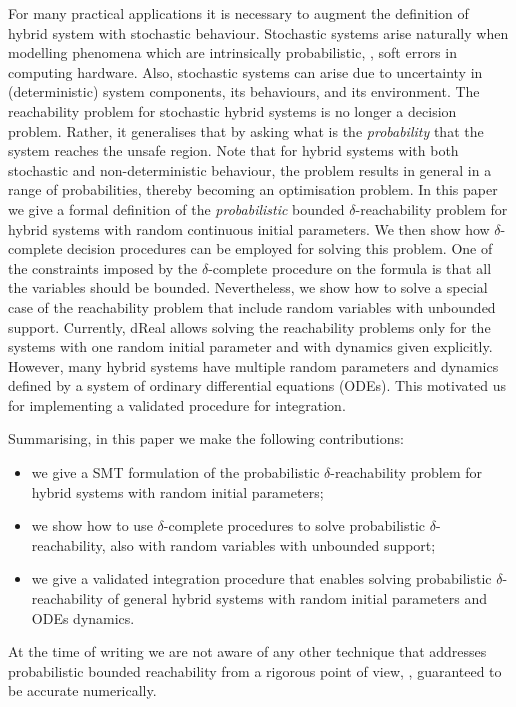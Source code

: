 For many practical applications it is necessary to augment the definition of hybrid system with 
stochastic behaviour. Stochastic systems arise naturally when modelling phenomena which are 
intrinsically probabilistic, \eg, soft errors in computing hardware. Also, stochastic systems 
can arise due to uncertainty in (deterministic) system components, its behaviours, and its 
environment. The reachability problem for stochastic hybrid systems is no longer a decision
problem. Rather, it generalises that by asking what is the {\em probability} that the system
reaches the unsafe region. Note that for hybrid systems with both stochastic and non-deterministic
behaviour, the problem results in general in a range of probabilities, thereby becoming an
optimisation problem. In this paper we give a formal definition of the {\em probabilistic} bounded 
$\delta$-reachability problem for hybrid systems with random continuous initial parameters. 
We then show how $\delta$-complete decision procedures can be employed for solving this problem.
One of the constraints imposed by the $\delta$-complete procedure on the formula is that all 
the variables should be bounded. Nevertheless, we show how to solve a special case of the
reachability problem that include random variables with unbounded support.
Currently, dReal allows solving the reachability problems only for the systems with one random 
initial parameter and with dynamics given explicitly. However, many hybrid systems have 
multiple random parameters and dynamics defined by a system of ordinary differential equations 
(ODEs). This motivated us for implementing a validated procedure for integration.

Summarising, in this paper we make the following contributions:
\begin{itemize}
	\item we give a SMT formulation of the probabilistic $\delta$-reachability problem for 
		hybrid systems with random initial parameters;
	\item we show how to use $\delta$-complete procedures to solve probabilistic 
		$\delta$-reachability, also with random variables with unbounded support;
	\item we give a validated integration procedure that enables solving probabilistic 
		$\delta$-reachability of general hybrid systems with random initial parameters 
		and ODEs dynamics.
\end{itemize}
At the time of writing we are not aware of any other technique that addresses probabilistic bounded 
reachability from a rigorous point of view, \ie, guaranteed to be accurate numerically. 
